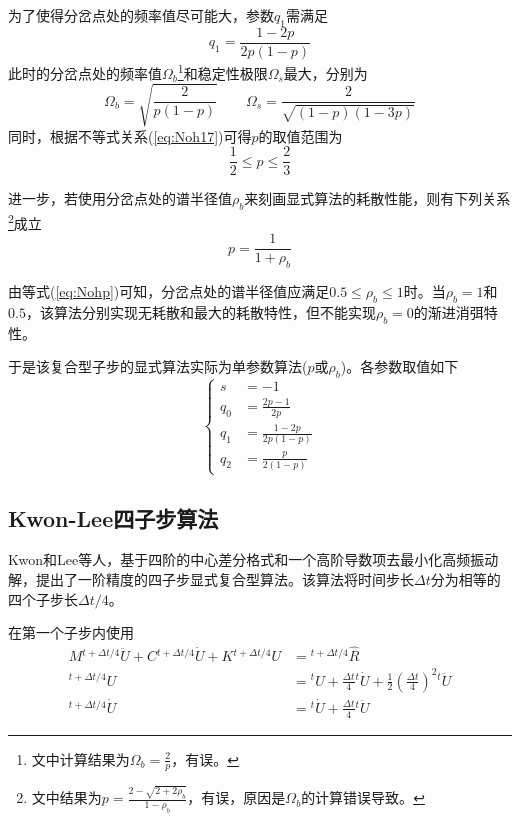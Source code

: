 为了使得分岔点处的频率值尽可能大，参数$q_1$需满足
\begin{equation}
q_1=\frac{1-2p}{2p(1-p)}
\end{equation}
此时的分岔点处的频率值$\Omega_b$\footnote{文中计算结果为$\Omega_b=\frac{2}{p}$，有误。}和稳定性极限$\Omega_s$最大，分别为
\begin{equation}
\Omega_b=\sqrt{\frac{2}{p(1-p)}}\qquad \Omega_s=\frac{2}{\sqrt{(1-p)(1-3p)}}
\end{equation}
同时，根据不等式关系(\ref{eq:Noh17})可得$p$的取值范围为
\begin{equation}
\frac{1}{2}\le p\le\frac{2}{3}\label{eq:Nohp}
\end{equation}

进一步，若使用分岔点处的谱半径值$\rho_b$来刻画显式算法的耗散性能，则有下列关系\footnote{文中结果为$p=\frac{2-\sqrt{2+2\rho_b}}{1-\rho_b}$，有误，原因是$\Omega_b$的计算错误导致。}成立
\begin{equation}
p=\frac{1}{1+\rho_b}\label{eq:Noh23}
\end{equation}

由等式(\ref{eq:Nohp})可知，分岔点处的谱半径值应满足$0.5\le\rho_b\le1$时。当$\rho_b=1$和$0.5$，该算法分别实现无耗散和最大的耗散特性，但不能实现$\rho_b=0$的渐进消弭特性。

于是该复合型子步的显式算法实际为单参数算法($p$或$\rho_b$)。各参数取值如下
\begin{equation}
\left\{\begin{aligned}
s&=-1\\
q_0&=\frac{2p-1}{2p}\\
q_1&=\frac{1-2p}{2p(1-p)}\\
q_2&=\frac{p}{2(1-p)}
\end{aligned}\right.
\end{equation}

\subsection{Kwon-Lee四子步算法}
Kwon和Lee等人\cite{Kwon2017}，基于四阶的中心差分格式和一个高阶导数项去最小化高频振动解，提出了一阶精度的四子步显式复合型算法。该算法将时间步长$\Delta t$分为相等的四个子步长$\Delta t/4$。

在第一个子步内使用
\begin{equation}
\begin{split}
M{^{t+\Delta t/4}\!\ddot{U}}+C{^{t+\Delta t/4}\!\dot{U}}+K{^{t+\Delta t/4}\!{U}}&={^{t+\Delta t/4}\!\hat{R}}\\
{^{t+\Delta t/4}\!U}&={^t\!U}+\frac{\Delta t}{4}{^t\!\dot{U}}+\frac12\left(\frac{\Delta t}{4}\right)^2{^t\!\ddot{U}}\\
{^{t+\Delta t/4}\!\dot{U}}&={^t\!\dot{U}}+\frac{\Delta t}{4}{^t\!\ddot{U}}
\end{split}
\end{equation}

